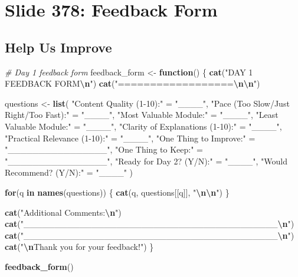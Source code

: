 \documentclass[
]{article}
\newenvironment{Shaded}{\begin{snugshade}}{\end{snugshade}}
\newcommand{\CommentTok}[1]{\textcolor[rgb]{0.56,0.35,0.01}{\textit{#1}}}
\newcommand{\ControlFlowTok}[1]{\textcolor[rgb]{0.13,0.29,0.53}{\textbf{#1}}}
\newcommand{\FunctionTok}[1]{\textcolor[rgb]{0.13,0.29,0.53}{\textbf{#1}}}
\newcommand{\NormalTok}[1]{#1}
\newcommand{\OtherTok}[1]{\textcolor[rgb]{0.56,0.35,0.01}{#1}}
\newcommand{\SpecialCharTok}[1]{\textcolor[rgb]{0.81,0.36,0.00}{\textbf{#1}}}
\newcommand{\StringTok}[1]{\textcolor[rgb]{0.31,0.60,0.02}{#1}}
\begin{document}
\section{Slide 378: Feedback Form}\label{slide-378-feedback-form}

\subsection{Help Us Improve}\label{help-us-improve}

\begin{Shaded}
\begin{Highlighting}[]
\CommentTok{\# Day 1 feedback form}
\NormalTok{feedback\_form }\OtherTok{\textless{}{-}} \ControlFlowTok{function}\NormalTok{() \{}
  \FunctionTok{cat}\NormalTok{(}\StringTok{"DAY 1 FEEDBACK FORM}\SpecialCharTok{\textbackslash{}n}\StringTok{"}\NormalTok{)}
  \FunctionTok{cat}\NormalTok{(}\StringTok{"==================}\SpecialCharTok{\textbackslash{}n\textbackslash{}n}\StringTok{"}\NormalTok{)}
  
\NormalTok{  questions }\OtherTok{\textless{}{-}} \FunctionTok{list}\NormalTok{(}
    \StringTok{"Content Quality (1{-}10):"} \OtherTok{=} \StringTok{"\_\_\_\_"}\NormalTok{,}
    \StringTok{"Pace (Too Slow/Just Right/Too Fast):"} \OtherTok{=} \StringTok{"\_\_\_\_"}\NormalTok{,}
    \StringTok{"Most Valuable Module:"} \OtherTok{=} \StringTok{"\_\_\_\_"}\NormalTok{,}
    \StringTok{"Least Valuable Module:"} \OtherTok{=} \StringTok{"\_\_\_\_"}\NormalTok{,}
    \StringTok{"Clarity of Explanations (1{-}10):"} \OtherTok{=} \StringTok{"\_\_\_\_"}\NormalTok{,}
    \StringTok{"Practical Relevance (1{-}10):"} \OtherTok{=} \StringTok{"\_\_\_\_"}\NormalTok{,}
    \StringTok{"One Thing to Improve:"} \OtherTok{=} \StringTok{"\_\_\_\_\_\_\_\_\_\_\_\_\_\_\_\_"}\NormalTok{,}
    \StringTok{"One Thing to Keep:"} \OtherTok{=} \StringTok{"\_\_\_\_\_\_\_\_\_\_\_\_\_\_\_\_"}\NormalTok{,}
    \StringTok{"Ready for Day 2? (Y/N):"} \OtherTok{=} \StringTok{"\_\_\_\_"}\NormalTok{,}
    \StringTok{"Would Recommend? (Y/N):"} \OtherTok{=} \StringTok{"\_\_\_\_"}
\NormalTok{  )}
  
  \ControlFlowTok{for}\NormalTok{(q }\ControlFlowTok{in} \FunctionTok{names}\NormalTok{(questions)) \{}
    \FunctionTok{cat}\NormalTok{(q, questions[[q]], }\StringTok{"}\SpecialCharTok{\textbackslash{}n\textbackslash{}n}\StringTok{"}\NormalTok{)}
\NormalTok{  \}}
  
  \FunctionTok{cat}\NormalTok{(}\StringTok{"Additional Comments:}\SpecialCharTok{\textbackslash{}n}\StringTok{"}\NormalTok{)}
  \FunctionTok{cat}\NormalTok{(}\StringTok{"\_\_\_\_\_\_\_\_\_\_\_\_\_\_\_\_\_\_\_\_\_\_\_\_\_\_\_\_\_\_\_\_\_\_\_\_\_\_\_\_\_}\SpecialCharTok{\textbackslash{}n}\StringTok{"}\NormalTok{)}
  \FunctionTok{cat}\NormalTok{(}\StringTok{"\_\_\_\_\_\_\_\_\_\_\_\_\_\_\_\_\_\_\_\_\_\_\_\_\_\_\_\_\_\_\_\_\_\_\_\_\_\_\_\_\_}\SpecialCharTok{\textbackslash{}n}\StringTok{"}\NormalTok{)}
  \FunctionTok{cat}\NormalTok{(}\StringTok{"}\SpecialCharTok{\textbackslash{}n}\StringTok{Thank you for your feedback!"}\NormalTok{)}
\NormalTok{\}}

\FunctionTok{feedback\_form}\NormalTok{()}
\end{Highlighting}
\end{Shaded}
\end{document}
